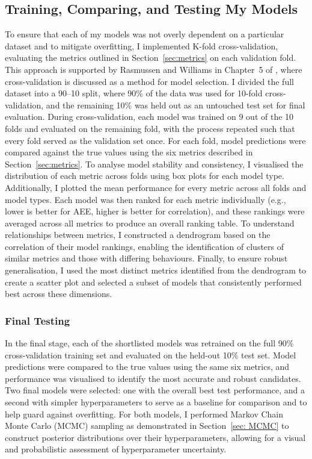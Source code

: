 \documentclass[12pt]{article}
\begin{document}
\subsection{Training, Comparing, and Testing My Models}

To ensure that each of my models was not overly dependent on a particular dataset and to mitigate overfitting, I implemented K-fold cross-validation, evaluating the metrics outlined in Section~\ref{sec:metrics} on each validation fold. This approach is supported by Rasmussen and Williams in Chapter~5 of \cite{bible}, where cross-validation is discussed as a method for model selection.
I divided the full dataset into a 90--10 split, where 90\% of the data was used for 10-fold cross-validation, and the remaining 10\% was held out as an untouched test set for final evaluation.
During cross-validation, each model was trained on 9 out of the 10 folds and evaluated on the remaining fold, with the process repeated such that every fold served as the validation set once. For each fold, model predictions were compared against the true values using the six metrics described in Section~\ref{sec:metrics}.
To analyse model stability and consistency, I visualised the distribution of each metric across folds using box plots for each model type. Additionally, I plotted the mean performance for every metric across all folds and model types.
Each model was then ranked for each metric individually (e.g., lower is better for AEE, higher is better for correlation), and these rankings were averaged across all metrics to produce an overall ranking table. To understand relationships between metrics, I constructed a dendrogram based on the correlation of their model rankings, enabling the identification of clusters of similar metrics
 and those with differing behaviours. Finally, to ensure robust generalisation, I used the most distinct metrics identified from the dendrogram to create a scatter plot and selected a subset of models that consistently performed best across these dimensions.

 \subsubsection*{Final Testing}
 In the final stage, each of the shortlisted models was retrained on the full 90\% cross-validation training set and evaluated on the held-out 10\% test set. Model predictions were compared to the true values using the same six metrics, and performance was visualised to identify the most accurate and robust candidates.
 Two final models were selected: one with the overall best test performance, and a second with simpler hyperparameters to serve as a baseline for comparison and to help guard against overfitting. For both models, I performed Markov Chain Monte Carlo (MCMC) sampling as demonstrated in Section~\ref{sec: MCMC}
to construct posterior distributions over their hyperparameters, allowing for a visual and probabilistic assessment of hyperparameter uncertainty.
 
\end{document}
